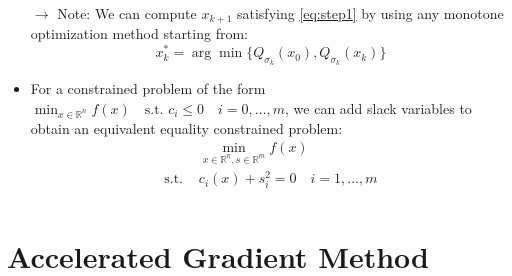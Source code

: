 \documentclass[12pt, openany]{report}
\newcommand{\R}{\mathbb{R}}
\theoremstyle{definition}
\begin{document}
\begin{itemize}
	\item [$\to$] Note: We can compute $x_{k+1}$ satisfying \eqref{eq:step1} by using any monotone optimization method starting from:
	\begin{equation}
		x_k^* = \arg \min \{Q_{\sigma_k}(x_0), Q_{\sigma_k}(x_k)\}
	\end{equation}
	\item For a constrained problem of the form $\displaystyle \min_{x \in \R^n} f(x) \quad \text{s.t. } c_i \leq 0 \quad i=0, \dots, m$, we can add slack variables to obtain an equivalent equality constrained problem:
	\begin{equation}
		\begin{aligned}
			&\min_{x \in \R^n, s \in \R^m} f(x)\\
			\text{s.t. } &c_i(x) + s^2_i= 0 \quad i=1,\dots,m\\
		\end{aligned}
	\end{equation}
\end{itemize}
\chapter{Accelerated Gradient Method}
\end{document}
